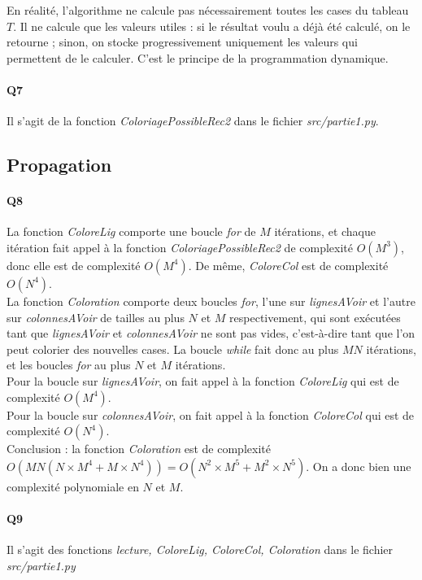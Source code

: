 \documentclass[12pt]{article}
\begin{document}
			En réalité, l'algorithme ne calcule pas nécessairement toutes les cases du tableau $ T $. Il ne calcule que les valeurs utiles : si le résultat voulu a déjà été calculé, on le retourne ; sinon, on stocke progressivement uniquement les valeurs qui permettent de le calculer. C'est le principe de la programmation dynamique.
			
		\paragraph{Q7}
			Il s'agit de la fonction \textit{ColoriagePossibleRec2} dans le fichier \textit{src/partie1.py}.
	
		\subsection{Propagation}
		
			\paragraph{Q8}
				La fonction \textit{ColoreLig} comporte une boucle \textit{for} de $ M $ itérations, et chaque itération fait appel à la fonction \textit{ColoriagePossibleRec2} de complexité $ O(M^3) $, donc elle est de complexité $ O(M^4) $. De même, \textit{ColoreCol} est de complexité $ O(N^4) $. \\
				La fonction \textit{Coloration} comporte deux boucles \textit{for}, l'une sur \textit{lignesAVoir} et l'autre sur \textit{colonnesAVoir} de tailles au plus $ N $ et $ M $ respectivement, qui sont exécutées tant que \textit{lignesAVoir} et \textit{colonnesAVoir} ne sont pas vides, c'est-à-dire tant que l'on peut colorier des nouvelles cases. La boucle \textit{while} fait donc au plus $ MN $ itérations, et les boucles \textit{for} au plus $ N $ et $ M $ itérations. \\
				Pour la boucle sur \textit{lignesAVoir}, on fait appel à la fonction \textit{ColoreLig} qui est de complexité $ O(M^4) $. \\
				Pour la boucle sur \textit{colonnesAVoir}, on fait appel à la fonction \textit{ColoreCol} qui est de complexité $ O(N^4) $. \\
				Conclusion : la fonction \textit{Coloration} est de complexité $ O(MN(N \times M^4 + M \times N^4)) = \boxed{O(N^2 \times M^5 + M^2 \times N^5)} $. On a donc bien une complexité polynomiale en $ N $ et $ M $.
			
			\paragraph{Q9}
				Il s'agit des fonctions \textit{lecture, ColoreLig, ColoreCol, Coloration} dans le fichier \textit{src/partie1.py}
			
\end{document}
